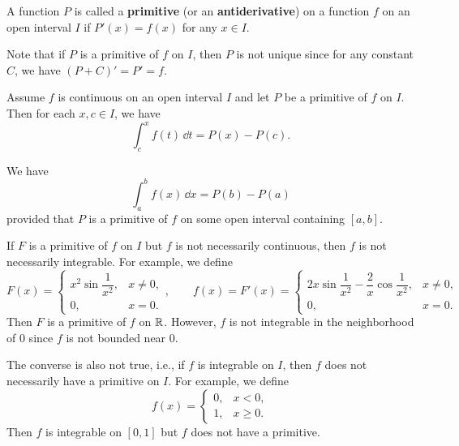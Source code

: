 	\begin{definitionenv}
		A function $P$ is called a \textbf{primitive} (or an \textbf{antiderivative}) on a function $f$ on an open interval $I$ if $P'(x)=f(x)$ for any $x\in I$. 
	\end{definitionenv}
    \begin{remarkenv}
        Note that if $P$ is a primitive of $f$ on $I$, then $P$ is not unique since for any constant $C$, we have $(P+C)'=P'=f$.
    \end{remarkenv}
	\begin{theoremenv}
		Assume $f$ is continuous on an open interval $I$ and let $P$ be a primitive of $f$ on $I$. Then for each $x,c \in I$, we have
		\[
		\int_c^x f(t)\, \dd t = P(x) - P(c).
		\]
		
	\end{theoremenv}
	\begin{remarkenv}
		We have 
		\[
		\int_a^b f(x)\, \dd x = P(b) - P(a)
		\]
		provided that $P$ is a primitive of $f$ on some open interval containing $[a,b]$.
	\end{remarkenv}
    \begin{remarkenv}
        If $F$ is a primitive of $f$ on $I$ but $f$ is not necessarily continuous, then $f$ is not necessarily integrable. For example, we define
        $$
        F(x)=
        \begin{cases}
        x^2\sin\dfrac{1}{x^2}, & x\ne 0,\\[6pt]
        0, & x=0.
        \end{cases},\qquad
        f(x)=F'(x)=
        \begin{cases}
        2x\sin\dfrac{1}{x^2}-\dfrac{2}{x}\cos\dfrac{1}{x^2}, & x\ne 0,\\[6pt]    
        0, & x=0.
        \end{cases}
        $$
        Then $F$ is a primitive of $f$ on $\mathbb{R}$. However, $f$ is not integrable in the neighborhood of $0$ since $f$ is not bounded near $0$.

        The converse is also not true, i.e., if $f$ is integrable on $I$, then $f$ does not necessarily have a primitive on $I$. For example, we define
        $$
        f(x)=
        \begin{cases}
        0, & x<0,\\
        1, & x\ge 0.
        \end{cases}
        $$
        Then $f$ is integrable on $[0,1]$ but $f$ does not have a primitive.
    \end{remarkenv}

